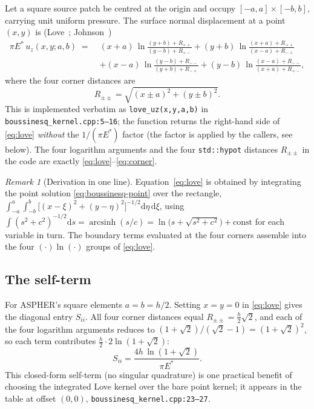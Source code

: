 \documentclass[11pt,a4paper]{article}
\newcommand{\Es}{E^{*}}
\newcommand{\code}[1]{\texttt{#1}}
\theoremstyle{definition}
\theoremstyle{remark}
\newtheorem{remark}{Remark}
\begin{document}
Let a square source patch be centred at the origin and occupy
$[-a,a]\times[-b,b]$, carrying unit uniform pressure. The surface normal
displacement at a point $(x,y)$ is (Love~\cite{Love1929};
Johnson~\cite[eq.~3.25]{Johnson1985})
\begin{equation}
\begin{aligned}
  \pi\Es\, u_z(x,y;a,b) \;=\;
  & (x+a)\,\ln\!\frac{(y+b)+R_{++}}{(y-b)+R_{+-}}
  + (y+b)\,\ln\!\frac{(x+a)+R_{++}}{(x-a)+R_{-+}} \\[2pt]
  &+ (x-a)\,\ln\!\frac{(y-b)+R_{--}}{(y+b)+R_{-+}}
  + (y-b)\,\ln\!\frac{(x-a)+R_{--}}{(x+a)+R_{+-}},
\end{aligned}
\label{eq:love}
\end{equation}
where the four corner distances are
\begin{equation}
  R_{\pm\pm} = \sqrt{(x\pm a)^2 + (y\pm b)^2}.
  \label{eq:corner}
\end{equation}
This is implemented verbatim as \code{love\_uz(x,y,a,b)} in
\code{boussinesq\_kernel.cpp:5--16}; the function returns the right-hand side of
\eqref{eq:love} \emph{without} the $1/(\pi\Es)$ factor (the factor is applied by
the callers, see below). The four logarithm arguments and the four
\code{std::hypot} distances $R_{\pm\pm}$ in the code are exactly
\eqref{eq:love}--\eqref{eq:corner}.

\begin{remark}[Derivation in one line]
Equation~\eqref{eq:love} is obtained by integrating the point solution
\eqref{eq:boussinesq-point} over the rectangle,
$\int_{-a}^{a}\!\int_{-b}^{b} \big[(x-\xi)^2+(y-\eta)^2\big]^{-1/2}
\mathrm{d}\eta\,\mathrm{d}\xi$, using
$\int (s^2+c^2)^{-1/2}\mathrm{d}s = \operatorname{arcsinh}(s/c)
=\ln\!\big(s+\sqrt{s^2+c^2}\big)+\text{const}$ for each variable in turn. The
boundary terms evaluated at the four corners assemble into the four
$(\cdot)\ln(\cdot)$ groups of \eqref{eq:love}.
\end{remark}

\subsection{The self-term}

For ASPHER's square elements $a=b=h/2$. Setting $x=y=0$ in \eqref{eq:love}
gives the diagonal entry $S_{ii}$. All four corner distances equal
$R_{\pm\pm}=\tfrac{h}{2}\sqrt2$, and each of the four logarithm arguments reduces
to $(1+\sqrt2)/(\sqrt2-1)=(1+\sqrt2)^2$, so each term contributes
$\tfrac{h}{2}\cdot 2\ln(1+\sqrt2)$:
\begin{equation}
  S_{ii} = \frac{4h\,\ln(1+\sqrt2)}{\pi \Es}.
  \label{eq:selfterm}
\end{equation}
This closed-form self-term (no singular quadrature) is one practical benefit of
choosing the integrated Love kernel over the bare point kernel; it appears in
the table at offset $(0,0)$, \code{boussinesq\_kernel.cpp:23--27}.
\end{document}
